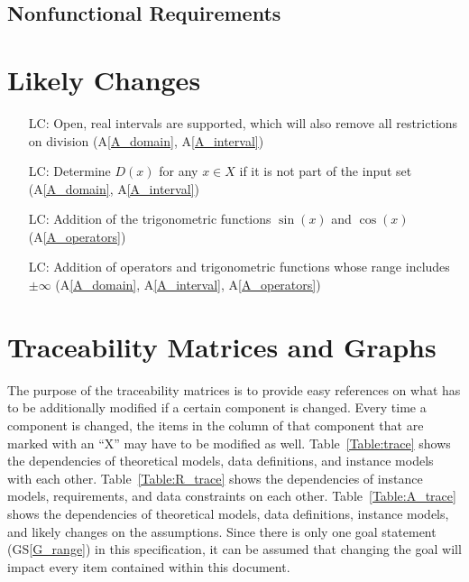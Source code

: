 \documentclass[12pt]{article}
\newcommand{\aref}[1]{A\ref{#1}}
\newcommand{\gsref}[1]{GS\ref{#1}}
\newcounter{lcnum} %
\begin{document}
\subsection{Nonfunctional Requirements}


\section{Likely Changes}    
\label{changes}

\noindent \begin{itemize}

\item[LC\refstepcounter{lcnum}\thelcnum\label{LC_openinterval}:] Open, real 
intervals are supported, which will also remove all restrictions on division 
(\aref{A_domain}, \aref{A_interval})

\item[LC\refstepcounter{lcnum}\thelcnum\label{LC_unknownDomain}:] Determine 
$D(x)$ for any $x \in X$ if it is not part of the input set (\aref{A_domain}, 
\aref{A_interval})

\item[LC\refstepcounter{lcnum}\thelcnum\label{LC_trig}:] Addition of the 
trigonometric functions $\sin(x)$ and $\cos(x)$ (\aref{A_operators})

\item[LC\refstepcounter{lcnum}\thelcnum\label{LC_infinity}:] Addition of 
operators and trigonometric functions whose range includes $\pm\infty$ 
(\aref{A_domain}, \aref{A_interval}, \aref{A_operators})

\end{itemize}

\section{Traceability Matrices and Graphs}
\label{trace}

The purpose of the traceability matrices is to provide easy references on what
has to be additionally modified if a certain component is changed.  Every time a
component is changed, the items in the column of that component that are marked
with an ``X'' may have to be modified as well.  Table~\ref{Table:trace} shows 
the dependencies of theoretical models, data definitions, and instance models 
with each other. Table~\ref{Table:R_trace} shows the dependencies of instance 
models, requirements, and data constraints on each other. 
Table~\ref{Table:A_trace} shows the dependencies of theoretical models, 
data definitions, instance models, and likely changes on the assumptions. Since 
there is only one goal statement (\gsref{G_range}) in this specification, it 
can be assumed that changing the goal will impact every item contained within 
this document.
\end{document}
